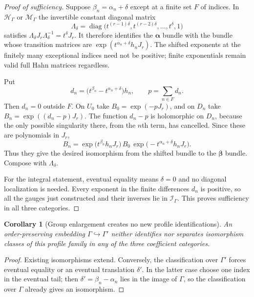 \documentclass[11pt,letterpaper]{article}
\newtheorem{corollary}[corollary]{Corollary}
\theoremstyle{definition}
\theoremstyle{remark}
\newcommand{\HH}{\mathscr H_\Gamma}
\newcommand{\II}{\mathscr I_\Gamma}
\newcommand{\MM}{\mathscr M_\Gamma}
\newcommand{\profile}{\boldsymbol\alpha}
\newcommand{\betaprofile}{\boldsymbol\beta}
\numberwithin{equation}{section}
\begin{document}
\begin{proof}[Proof of sufficiency]
Suppose $\beta_n=\alpha_n+\delta$ except at a finite set $F$ of indices. In
$\HH$ or $\MM$ the invertible constant diagonal matrix
\begin{equation}\label{nab:loc:eq:diagonal-shift}
 \Lambda_\delta=\operatorname{diag}\bigl(t^{(r-1)\delta},t^{(r-2)\delta},
 \ldots,t^\delta,1\bigr)
\end{equation}
satisfies $\Lambda_\delta J_r\Lambda_\delta^{-1}=t^\delta J_r$. It therefore
identifies the $\profile$ bundle with the bundle whose transition matrices are
$\exp(t^{\alpha_n+\delta}h_nJ_r)$. The shifted exponents at the finitely many
exceptional indices need not be positive; finite exponentials remain valid full
Hahn matrices regardless.

Put
\[
 d_n=\bigl(t^{\beta_n}-t^{\alpha_n+\delta}\bigr)h_n,\qquad
 p=\sum_{n\in F}d_n.
\]
Then $d_n=0$ outside $F$. On $U_0$ take $B_0=\exp(-pJ_r)$, and on $D_n$ take
$B_n=\exp((d_n-p)J_r)$. The function $d_n-p$ is holomorphic on $D_n$, because
the only possible singularity there, from the $n$th term, has cancelled. Since
these are polynomials in $J_r$,
\[
 B_n=\exp\bigl(t^{\beta_n}h_nJ_r\bigr)\,B_0\,
       \exp\bigl(-t^{\alpha_n+\delta}h_nJ_r\bigr).
\]
Thus they give the desired isomorphism from the shifted bundle to the
$\betaprofile$ bundle. Compose with $\Lambda_\delta$.

For the integral statement, eventual equality means $\delta=0$ and no diagonal
localization is needed. Every exponent in the finite differences $d_n$ is
positive, so all the gauges just constructed and their inverses lie in $\II$.
This proves sufficiency in all three categories.
\end{proof}

\begin{corollary}[Group enlargement creates no new profile identifications]
\label{nab:loc:cor:class-enlarge}
An order-preserving embedding $\Gamma\hookrightarrow\Gamma'$ neither identifies
nor separates isomorphism classes of this profile family in any of the three
coefficient categories.
\end{corollary}

\begin{proof}
Existing isomorphisms extend. Conversely, the classification over $\Gamma'$
forces eventual equality or an eventual translation $\delta'$. In the latter
case choose one index in the eventual tail; then $\delta'=\beta_n-\alpha_n$ lies
in the image of $\Gamma$, so the classification over $\Gamma$ already gives an
isomorphism.
\end{proof}
\end{document}
